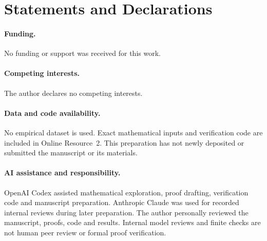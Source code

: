 \documentclass[11pt]{article}
\theoremstyle{remark}
\begin{document}
\section*{Statements and Declarations}
\paragraph{Funding.} No funding or support was received for this work.
\paragraph{Competing interests.} The author declares no competing interests.
\paragraph{Data and code availability.}
No empirical dataset is used. Exact mathematical inputs and verification code
are included in Online Resource~2. This preparation has not newly deposited
or submitted the manuscript or its materials.
\paragraph{AI assistance and responsibility.}
OpenAI Codex assisted mathematical exploration, proof drafting, verification
code and manuscript preparation. Anthropic Claude was used for recorded
internal reviews during later preparation. The author personally reviewed
the manuscript, proofs, code and results. Internal model reviews and finite
checks are not human peer review or formal proof verification.
\end{document}
